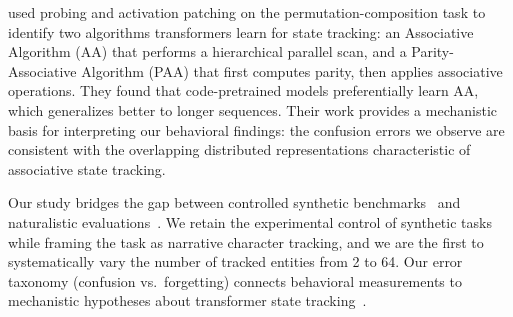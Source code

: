 \citet{li2025state} used probing and activation patching on the permutation-composition task to identify two algorithms transformers learn for state tracking: an Associative Algorithm (AA) that performs a hierarchical parallel scan, and a Parity-Associative Algorithm (PAA) that first computes parity, then applies associative operations.
They found that code-pretrained models preferentially learn AA, which generalizes better to longer sequences.
Their work provides a mechanistic basis for interpreting our behavioral findings: the confusion errors we observe are consistent with the overlapping distributed representations characteristic of associative state tracking.

Our study bridges the gap between controlled synthetic benchmarks~\citep{kim2023entity,hsieh2024ruler} and naturalistic evaluations~\citep{hamilton2025tldm,baruah2025chatter}.
We retain the experimental control of synthetic tasks while framing the task as narrative character tracking, and we are the first to systematically vary the number of tracked entities from 2 to 64.
Our error taxonomy (confusion vs.\ forgetting) connects behavioral measurements to mechanistic hypotheses about transformer state tracking~\citep{li2025state}.

